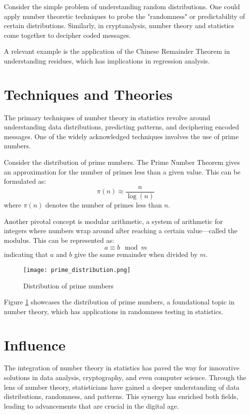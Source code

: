 \documentclass{article}
\begin{document}
Consider the simple problem of understanding random distributions. One could apply number theoretic techniques to probe the "randomness" or predictability of certain distributions. Similarly, in cryptanalysis, number theory and statistics come together to decipher coded messages.

A relevant example is the application of the Chinese Remainder Theorem in understanding residues, which has implications in regression analysis.

\section{Techniques and Theories}
The primary techniques of number theory in statistics revolve around understanding data distributions, predicting patterns, and deciphering encoded messages. One of the widely acknowledged techniques involves the use of prime numbers.

Consider the distribution of prime numbers. The Prime Number Theorem gives an approximation for the number of primes less than a given value. This can be formulated as:
\begin{equation}
\pi(n) \approx \frac{n}{\log(n)}
\end{equation}
where \(\pi(n)\) denotes the number of primes less than \(n\).

Another pivotal concept is modular arithmetic, a system of arithmetic for integers where numbers wrap around after reaching a certain value—called the modulus. This can be represented as:
\begin{equation}
a \equiv b \mod{m}
\end{equation}
indicating that \(a\) and \(b\) give the same remainder when divided by \(m\).

\begin{figure}[h]
\centering
\texttt{[image: prime\_distribution.png]}
\caption{Distribution of prime numbers}
\label{prime_distribution}
\end{figure}

Figure \ref{prime_distribution} showcases the distribution of prime numbers, a foundational topic in number theory, which has applications in randomness testing in statistics.


\section{Influence}
The integration of number theory in statistics has paved the way for innovative solutions in data analysis, cryptography, and even computer science. Through the lens of number theory, statisticians have gained a deeper understanding of data distributions, randomness, and patterns. This synergy has enriched both fields, leading to advancements that are crucial in the digital age\citet{wang2016}.
\end{document}
